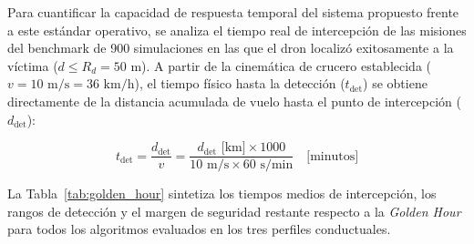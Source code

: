 Para cuantificar la capacidad de respuesta temporal del sistema propuesto frente a este estándar operativo, se analiza el tiempo real de intercepción de las misiones del benchmark de 900 simulaciones en las que el dron localizó exitosamente a la víctima ($d \le R_d = 50\text{ m}$). A partir de la cinemática de crucero establecida ($v = 10\text{ m/s} = 36\text{ km/h}$), el tiempo físico hasta la detección ($t_{\text{det}}$) se obtiene directamente de la distancia acumulada de vuelo hasta el punto de intercepción ($d_{\text{det}}$):

\begin{equation}
    t_{\text{det}} = \frac{d_{\text{det}}}{v} = \frac{d_{\text{det}}\text{ [km]} \times 1000}{10\text{ m/s} \times 60\text{ s/min}} \quad \text{[minutos]}
\end{equation}

La Tabla~\ref{tab:golden_hour} sintetiza los tiempos medios de intercepción, los rangos de detección y el margen de seguridad restante respecto a la \textit{Golden Hour} para todos los algoritmos evaluados en los tres perfiles conductuales.

